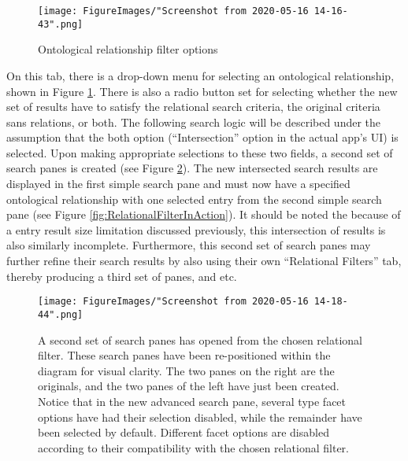 \documentclass[12pt, letterpaper]{report}
\begin{document}
\begin{figure}[h!]
	\begin{center}
		\texttt{[image: FigureImages/"Screenshot from 2020-05-16 14-16-43".png]}
	\end{center}
	\caption{Ontological relationship filter options}
	\label{fig:OntologicalRelationshipFilterOptions}
\end{figure}

\newpage

On this tab, there is a drop-down menu for selecting an ontological relationship, shown in Figure \ref{fig:OntologicalRelationshipFilterOptions}. There is also a radio button set for selecting whether the new set of results have to satisfy the relational search criteria, the original criteria sans relations, or both. The following search logic will be described under the assumption that the both option (``Intersection'' option in the actual app's UI) is selected. Upon making appropriate selections to these two fields, a second set of search panes is created (see Figure \ref{fig:RelationalFilterNewPanes}). The new intersected search results are displayed in the first simple search pane and must now have a specified ontological relationship with one selected entry from the second simple search pane (see Figure \ref{fig:RelationalFilterInAction}). It should be noted the because of a entry result size limitation discussed previously, this intersection of results is also similarly incomplete.  Furthermore, this second set of search panes may further refine their search results by also using their own ``Relational Filters'' tab, thereby producing a third set of panes, and etc.

\newpage

\begin{figure}[h!]
	\begin{center}
		\texttt{[image: FigureImages/"Screenshot from 2020-05-16 14-18-44".png]}
	\end{center}
	\caption{A second set of search panes has opened from the chosen relational filter. These search panes have been re-positioned within the diagram for visual clarity. The two panes on the right are the originals, and the two panes of the left have just been created. Notice that in the new advanced search pane, several type facet options have had their selection disabled, while the remainder have been selected by default. Different facet options are disabled according to their compatibility with the chosen relational filter.}
	\label{fig:RelationalFilterNewPanes}
\end{figure}
\end{document}
